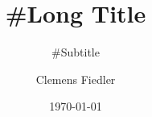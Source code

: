 \documentclass[aspectratio=1612]{beamer}
\title[#Short Title]{\huge #Long Title} %
\subtitle{#Subtitle}
\author[Clemens Fiedler]{\Large Clemens Fiedler}
\institute[Tilburg]{Tilburg University}
\date[\today]{\today}
\begin{document}
	\begin{frame}[plain]  %
		\titlepage
	\end{frame}

	\begin{frame}
		\tableofcontents
	\end{frame}

\end{document}
